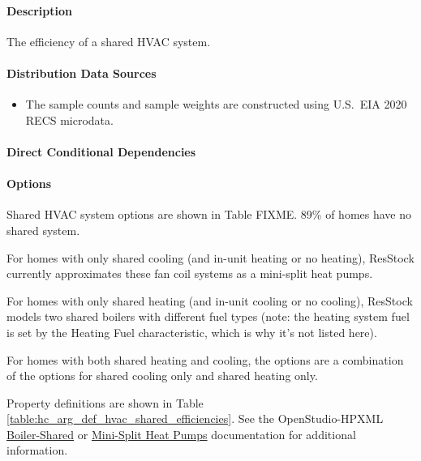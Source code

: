 \paragraph{Description}
% 
The efficiency of a shared HVAC system.

\paragraph{Distribution Data Sources}
% 
\begin{itemize}
    \item The sample counts and sample weights are constructed using U.S.~EIA 2020 RECS microdata.
\end{itemize}

\paragraph{Direct Conditional Dependencies}


\paragraph{Options}
Shared HVAC system options are shown in Table FIXME. 89\% of homes have no shared system.

For homes with only shared cooling (and in-unit heating or no heating), ResStock currently approximates these fan coil systems as a mini-split heat pumps.

For homes with only shared heating (and in-unit cooling or no cooling), ResStock models two shared boilers with different fuel types (note: the heating system fuel is set by the Heating Fuel characteristic, which is why it's not listed here).

For homes with both shared heating and cooling, the options are a combination of the options for shared cooling only and shared heating only.



Property definitions are shown in Table \ref{table:hc_arg_def_hvac_shared_efficiencies}. See the OpenStudio-HPXML \href{https://openstudio-hpxml.readthedocs.io/en/v1.10.0/workflow_inputs.html#boiler-shared}{Boiler-Shared} or \href{https://openstudio-hpxml.readthedocs.io/en/v1.10.0/workflow_inputs.html#mini-split-heat-pump}{Mini-Split Heat Pumps} documentation for additional information.

